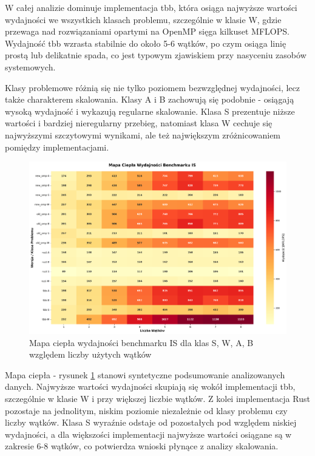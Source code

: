 W całej analizie dominuje implementacja tbb, która osiąga najwyższe wartości wydajności we wszystkich klasach problemu, szczególnie w klasie W, gdzie przewaga nad rozwiązaniami opartymi na OpenMP sięga kilkuset MFLOPS. Wydajność tbb wzrasta stabilnie do około 5-6 wątków, po czym osiąga linię prostą lub delikatnie spada, co jest typowym zjawiskiem przy nasyceniu zasobów systemowych.

Klasy problemowe różnią się nie tylko poziomem bezwzględnej wydajności, lecz także charakterem skalowania. Klasy A i B zachowują się podobnie - osiągają wysoką wydajność i wykazują regularne skalowanie. Klasa S prezentuje niższe wartości i bardziej nieregularny przebieg, natomiast klasa W cechuje się najwyższymi szczytowymi wynikami, ale też największym zróżnicowaniem pomiędzy implementacjami.

\begin{figure}[H]
    \centering
    \includegraphics[width=\textwidth]{analiza/images/parallel/is/x86/is_mapa_ciepla_wydajnosci.png}
    \caption{Mapa ciepła wydajności benchmarku IS dla klas S, W, A, B względem liczby użytych wątków}
    \label{is_heatmap_wydajnosci_x86}
\end{figure}
Mapa ciepła - rysunek \ref{is_heatmap_wydajnosci_x86} stanowi syntetyczne podsumowanie analizowanych danych. Najwyższe wartości wydajności skupiają się wokół implementacji tbb, szczególnie w klasie W i przy większej liczbie wątków. Z kolei implementacja Rust pozostaje na jednolitym, niskim poziomie niezależnie od klasy problemu czy liczby wątków. Klasa S wyraźnie odstaje od pozostałych pod względem niskiej wydajności, a dla większości implementacji najwyższe wartości osiągane są w zakresie 6-8 wątków, co potwierdza wnioski płynące z analizy skalowania.

